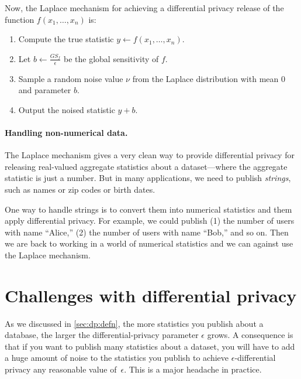 Now, the Laplace mechanism for achieving a differential privacy release
of the function $f(x_1, \dots, x_n)$ is:
\begin{enumerate}
  \item Compute the true statistic $y \gets f(x_1, \dots, x_n)$.
  \item Let $b \gets \frac{GS_f}{\epsilon}$ be the global sensitivity of $f$.
  \item Sample a random noise value $\nu$ from the Laplace distribution
        with mean $0$ and parameter $b$.
  \item Output the noised statistic $y + b$.
\end{enumerate}


\paragraph{Handling non-numerical data.}
The Laplace mechanism gives a very clean way to provide differential
privacy for releasing real-valued aggregate statistics about
a dataset---where the aggregate statistic is just a number.
But in many applications, we need to publish \emph{strings},
such as names or zip codes or birth dates.

One way to handle strings is to convert them into numerical 
statistics and them apply differential privacy.
For example, we could publish (1) the number of users
with name ``Alice,'' (2) the number of users with 
name ``Bob,'' and so on.
Then we are back to working in a world of numerical statistics
and we can against use the Laplace mechanism.

\section{Challenges with differential privacy}

As we discussed in \cref{sec:dp:defn}, the more statistics you publish
about a database, the larger the differential-privacy parameter $\epsilon$ grows.
A consequence is that if you want to publish many statistics about a dataset,
you will have to add a huge amount of noise to the statistics you publish
to achieve $\epsilon$-differential privacy any reasonable value of~$\epsilon$.
This is a major headache in practice.

